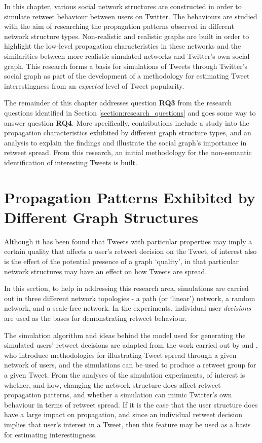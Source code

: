 In this chapter, various social network structures are constructed in order to simulate retweet behaviour between users on Twitter. The behaviours are studied with the aim of researching the propagation patterns observed in different network structure types. Non-realistic and realistic graphs are built in order to highlight the low-level propagation characteristics in these networks and the similarities between more realistic simulated networks and Twitter's own social graph. 
This research forms a basis for simulations of Tweets through Twitter's social graph as part of the development of a methodology  for estimating Tweet interestingness from an \textit{expected} level of Tweet popularity. 

The remainder of this chapter addresses question \textbf{RQ3} from the research questions identified in Section \ref{section:research_questions} and goes some way to answer question \textbf{RQ4}. More specifically, contributions include a study into the propagation characteristics exhibited by different graph structure types, and an analysis to explain the findings and illustrate the social graph's importance in retweet spread. From this research, an initial methodology for the non-semantic identification of interesting Tweets is built. 
 

\section{Propagation Patterns Exhibited by Different Graph Structures}
Although it has been found that Tweets with particular properties may imply a certain quality that affects a user's retweet decision on the Tweet, of interest also is the effect of the  potential presence of a graph `quality', in that particular network structures may have an effect on how Tweets are spread.


In this section, to help in addressing this research area, simulations are carried out in three different network topologies - a path (or `linear') network, a random network, and a scale-free network. In the experiments, individual user \textit{decisions} are used as the bases for demonstrating retweet behaviour.  

The simulation algorithm and ideas behind the model used for generating the simulated users' retweet decisions are adapted from the work carried out by \citet{zhu11} and \citet{peng11}, who introduce methodologies for illustrating Tweet spread through a given network of users, and the simulations can be used to produce a retweet group for a given Tweet. From the analyses of the simulation experiments, of interest is whether, and how, changing the network structure does affect retweet propagation patterns, and whether a simulation can mimic Twitter's own behaviour in terms of retweet spread. If it is the case that the user structure does have a large impact on propagation, and since an individual retweet decision implies that user's interest in a Tweet, then this feature may be used as a basis for estimating interestingness. 


